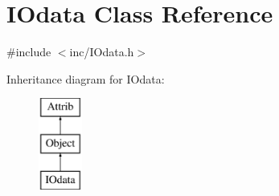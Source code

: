 \hypertarget{classIOdata}{}\section{I\+Odata Class Reference}
\label{classIOdata}


{\ttfamily \#include $<$inc/\+I\+Odata.\+h$>$}

Inheritance diagram for I\+Odata\+:\begin{figure}[H]
\begin{center}
\leavevmode
\includegraphics[height=3.000000cm]{classIOdata}
\end{center}
\end{figure}
